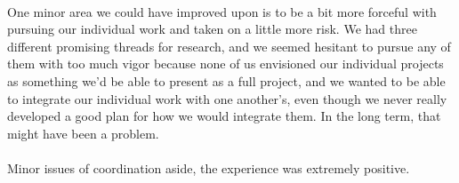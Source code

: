 \documentclass[11pt]{article} %
\begin{document}
\paragraph{}One minor area we could have improved upon is to be a bit more forceful with pursuing our individual work and taken on a little more risk. We had three different promising threads for research, and we seemed hesitant to pursue any of them with too much vigor because none of us envisioned our individual projects as something we'd be able to present as a full project, and we wanted to be able to integrate our individual work with one another's, even though we never really developed a good plan for how we would integrate them. In the long term, that might have been a problem.

\paragraph{}Minor issues of coordination aside, the experience was extremely positive.
\end{document}
